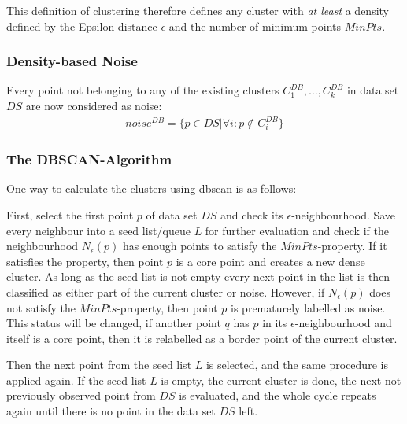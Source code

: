 This definition of clustering therefore defines any cluster with \textit{at least} a density defined by the Epsilon-distance $\epsilon$ and the number of minimum points $MinPts$.

\subsubsection*{Density-based Noise}
Every point not belonging to any of the existing clusters $C^{DB}_1, \dotsc, C^{DB}_k$ in data set $DS$ are now considered as noise: 
\begin{align}
    noise^{DB} = \{p \in  DS | \forall i : p \notin C^{DB}_i\}
\end{align}

\subsubsection*{The DBSCAN-Algorithm}
One way to calculate the clusters using \gls{dbscan} is as follows:

First, select the first point $p$ of data set $DS$ and check its $\epsilon$-neighbourhood. Save every neighbour into a seed list/queue $L$ for further evaluation and check if the neighbourhood $N_{\epsilon}(p)$ has enough points to satisfy the $MinPts$-property. 
If it satisfies the property, then point $p$ is a core point and creates a new dense cluster. As long as the seed list is not empty every next point in the list is then classified as either part of the current cluster or noise.
However, if $N_{\epsilon}(p)$ does not satisfy the $MinPts$-property, then point $p$ is prematurely labelled as noise. This status will be changed, if another point $q$ has $p$ in its $\epsilon$-neighbourhood and itself is a core point, then it is relabelled as a border point of the current cluster.

Then the next point from the seed list $L$ is selected, and the same procedure is applied again.
If the seed list $L$ is empty, the current cluster is done, the next not previously observed point from $DS$ is evaluated, and the whole cycle repeats again until there is no point in the data set $DS$ left.


